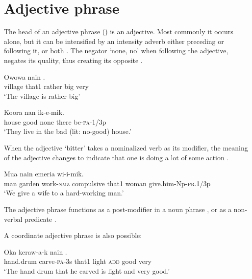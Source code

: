 \section{Adjective phrase}
{}
The head of an adjective phrase () is an adjective. Most commonly it occurs alone, but it can be intensified by an intensity adverb either preceding or following it, or both .  The negator  `none, no' when following the adjective, negates its quality, thus creating its opposite .  

\ea%
\label{ex:4:x841}
\gll Owowa  nain    . \\
    village  that1  rather  big  very  \\
\glt`The village is rather big'
\z

\ea%
\label{ex:4:x842}
\gll Koora     nan  ik-e-mik. \\
   house  good  none  there  be-\textsc{pa}-1/3p   \\
\glt`They live in the bad (lit: no-good) house.'
\z

When the adjective   `bitter' takes a nominalized verb as its modifier, the meaning of the adjective changes to indicate that one is doing a lot of some action .

\ea%
\label{ex:4:x840}
\gll Mua       nain  emeria wi-i-mik. \\
   man  garden  work-\textsc{nmz}  compulsive  that1  woman  give.him-Np-\textsc{pr}.1/3p   \\
\glt`We give a wife to a hard-working man.'
\z

The adjective phrase functions as a post-modifier in a noun phrase , or as a non-verbal predicate . 

A coordinate adjective phrase is also possible:

\ea%
\label{ex:4:x891}
\gll Oka  keraw-a-k  nain     . \\
    hand.drum  carve-\textsc{pa}-3s  that1  light  \textsc{add}  good  very  \\
\glt`The hand drum that he carved is light and very good.'
\z

